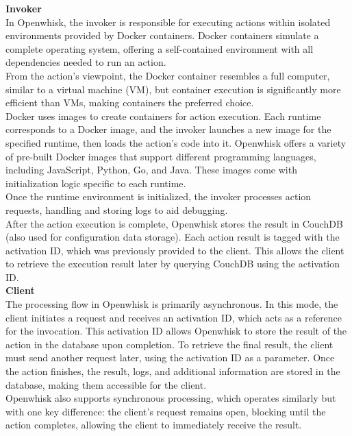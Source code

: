 \vspace{5pt}
\textbf{Invoker}\\
In Openwhisk, the invoker is responsible for executing actions within isolated environments provided by Docker containers. Docker containers simulate a complete operating system, offering a self-contained environment with all dependencies needed to run an action.\vspace{14pt}\\
From the action’s viewpoint, the Docker container resembles a full computer, similar to a virtual machine (VM), but container execution is significantly more efficient than VMs, making containers the preferred choice.\\
Docker uses images to create containers for action execution. Each runtime corresponds to a Docker image, and the invoker launches a new image for the specified runtime, then loads the action’s code into it. Openwhisk offers a variety of pre-built Docker images that support different programming languages, including JavaScript, Python, Go, and Java. These images come with initialization logic specific to each runtime.\\
Once the runtime environment is initialized, the invoker processes action requests, handling and storing logs to aid debugging.\vspace{14pt}\\
After the action execution is complete, Openwhisk stores the result in CouchDB (also used for configuration data storage). Each action result is tagged with the activation ID, which was previously provided to the client. This allows the client to retrieve the execution result later by querying CouchDB using the activation ID.\vspace{14pt}\\
\textbf{Client}\\
The processing flow in Openwhisk is primarily asynchronous. In this mode, the client initiates a request and receives an activation ID, which acts as a reference for the invocation. This activation ID allows Openwhisk to store the result of the action in the database upon completion. To retrieve the final result, the client must send another request later, using the activation ID as a parameter. Once the action finishes, the result, logs, and additional information are stored in the database, making them accessible for the client.\vspace{14pt}\\
Openwhisk also supports synchronous processing, which operates similarly but with one key difference: the client’s request remains open, blocking until the action completes, allowing the client to immediately receive the result.\cite{sciabarra2019learning}